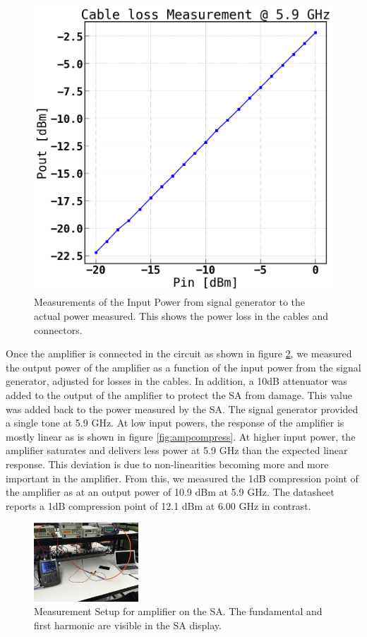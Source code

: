 \documentclass[twocolumn, aps, apl]{revtex4-1}
\begin{document}
\begin{figure}[!htbp]
    \centering
    \includegraphics[scale=0.35]{cable_power_loss.png}
    \caption{Measurements of the Input Power from signal generator to the actual power measured. This shows the power loss in the cables and connectors.}
    \label{fig:cableloss}
\end{figure}

Once the amplifier is connected in the circuit as shown in figure \ref{fig:ampspectralimg}, we measured the output power of the amplifier as a function of the input power from the signal generator, adjusted for losses in the cables. In addition, a 10dB attenuator was added to the output of the amplifier to protect the SA from damage. This value was added back to the power measured by the SA. The signal generator provided a single tone at 5.9 GHz. At low input powers, the response of the amplifier is mostly linear as is shown in figure \ref{fig:ampcompress}. At higher input power, the amplifier saturates and delivers less power at 5.9 GHz than the expected linear response. This deviation is due to non-linearities becoming more and more important in the amplifier. From this, we measured the 1dB compression point of the amplifier as at an output power of 10.9 dBm at 5.9 GHz. The datasheet reports a 1dB compression point of 12.1 dBm at 6.00 GHz in contrast.

\begin{figure}[!htbp]
    \centering
    \includegraphics[width=0.35\textwidth]{amp_spectral_measurement.jpeg}
    \caption{Measurement Setup for amplifier on the SA. The fundamental and first harmonic are visible in the SA display.}
    \label{fig:ampspectralimg}
\end{figure}
\end{document}

